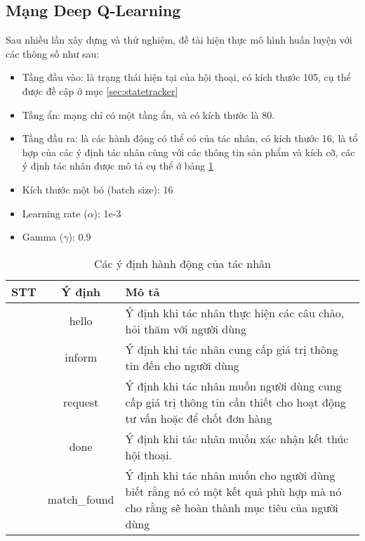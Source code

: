 \subsection{Mạng Deep Q-Learning}
\label{subsec:agent}
Sau nhiều lần xây dựng và thử nghiệm, đề tài hiện thực mô hình huấn luyện với các thông số như sau:

\begin{itemize}
    \item Tầng đầu vào: là trạng thái hiện tại của hội thoại, có kích thước 105, cụ thể được đề cập ở mục \ref{sec:statetracker}
    \item Tầng ẩn: mạng chỉ có một tầng ẩn, và có kích thước là 80.
    \item Tầng đầu ra: là các hành động có thể có của tác nhân, có kích thước 16, là tổ hợp của các ý định tác nhân cùng với các thông tin sản phẩm và kích cỡ, các ý định tác nhân được mô tả cụ thể ở bảng \ref{tab:agentintent}
    \item Kích thước một bó (batch size): 16
    \item Learning rate ($\alpha$): 1e-3
    \item Gamma ($\gamma$): 0.9
\end{itemize}

\begin{table}[!ht]
\caption{Các ý định hành động của tác nhân}
\centering
\begin{tabular}{|p{1cm}|c|p{10cm}|}
\hline
\centering\textbf{STT} & 
\centering\textbf{Ý định} & 
\parbox[t]{11cm}{\centering\textbf{Mô tả}} \\ %
\hline
{} & 
hello & 
Ý định khi tác nhân thực hiện các câu chào, hỏi thăm với người dùng \\
\hline
{} & 
inform & 
Ý định khi tác nhân cung cấp giá trị thông tin đến cho người dùng \\
\hline
{} & 
request & 
Ý định khi tác nhân muốn người dùng cung cấp giá trị thông tin cần thiết cho hoạt động tư vấn hoặc để chốt đơn hàng \\
\hline
{} & 
done & 
Ý định khi tác nhân muốn xác nhận kết thúc hội thoại. \\
\hline
{} & 
match\_found & 
Ý định khi tác nhân muốn cho người dùng biết rằng nó có một kết quả phù hợp mà nó cho rằng sẽ hoàn thành mục tiêu của người dùng \\
\hline
\end{tabular}
\label{tab:agentintent}
\end{table}

